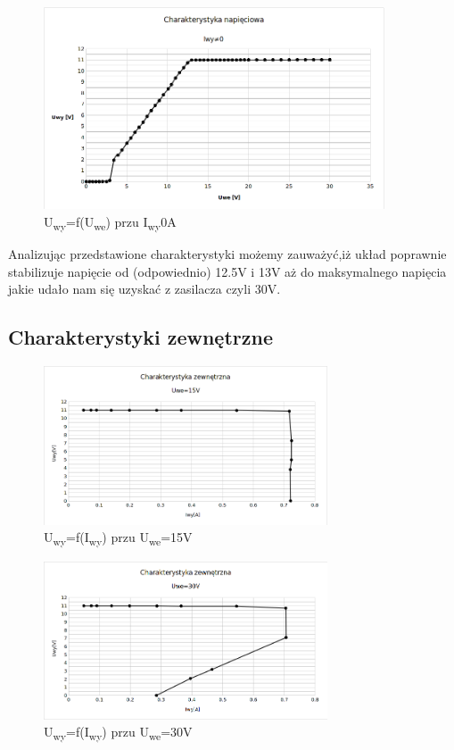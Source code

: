 \documentclass[a4paper,12pt]{article}
\begin{document}
\begin{figure}[h!]
  \center
  \includegraphics[width=0.90\textwidth]{charak-napieciowa2}
  \caption{U\textsubscript{wy}=f(U\textsubscript{we}) przu I\textsubscript{wy}\neq0A}
\end{figure}

Analizując przedstawione charakterystyki możemy zauważyć,iż układ poprawnie stabilizuje napięcie od (odpowiednio) 12.5V i 13V aż do maksymalnego
napięcia jakie udało nam się uzyskać z zasilacza czyli 30V.
\pagebreak
\subsection{Charakterystyki zewnętrzne}

\begin{figure}[h]
  \center
  \includegraphics[width=0.75\textwidth]{charak-zew1}
  \caption{U\textsubscript{wy}=f(I\textsubscript{wy}) przu U\textsubscript{we}=15V}
\end{figure}

\begin{figure}[h]
  \center
  \includegraphics[width=0.75\textwidth]{charak-zew2}
  \caption{U\textsubscript{wy}=f(I\textsubscript{wy}) przu U\textsubscript{we}=30V}
\end{figure}
\end{document}
